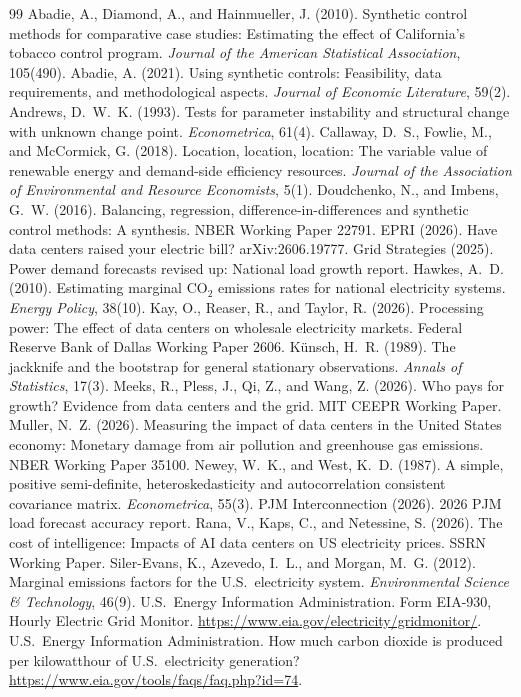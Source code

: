 \documentclass[11pt,a4paper]{article}
\begin{document}
\begin{thebibliography}{99}\small
{} Abadie, A., Diamond, A., and Hainmueller, J. (2010). Synthetic control methods for comparative case studies: Estimating the effect of California's tobacco control program. \emph{Journal of the American Statistical Association}, 105(490).
 Abadie, A. (2021). Using synthetic controls: Feasibility, data requirements, and methodological aspects. \emph{Journal of Economic Literature}, 59(2).
 Andrews, D.~W.~K. (1993). Tests for parameter instability and structural change with unknown change point. \emph{Econometrica}, 61(4).
 Callaway, D.~S., Fowlie, M., and McCormick, G. (2018). Location, location, location: The variable value of renewable energy and demand-side efficiency resources. \emph{Journal of the Association of Environmental and Resource Economists}, 5(1).
 Doudchenko, N., and Imbens, G.~W. (2016). Balancing, regression, difference-in-differences and synthetic control methods: A synthesis. NBER Working Paper 22791.
 EPRI (2026). Have data centers raised your electric bill? arXiv:2606.19777.
 Grid Strategies (2025). Power demand forecasts revised up: National load growth report.
 Hawkes, A.~D. (2010). Estimating marginal CO$_2$ emissions rates for national electricity systems. \emph{Energy Policy}, 38(10).
 Kay, O., Reaser, R., and Taylor, R. (2026). Processing power: The effect of data centers on wholesale electricity markets. Federal Reserve Bank of Dallas Working Paper 2606.
 K\"unsch, H.~R. (1989). The jackknife and the bootstrap for general stationary observations. \emph{Annals of Statistics}, 17(3).
 Meeks, R., Pless, J., Qi, Z., and Wang, Z. (2026). Who pays for growth? Evidence from data centers and the grid. MIT CEEPR Working Paper.
 Muller, N.~Z. (2026). Measuring the impact of data centers in the United States economy: Monetary damage from air pollution and greenhouse gas emissions. NBER Working Paper 35100.
 Newey, W.~K., and West, K.~D. (1987). A simple, positive semi-definite, heteroskedasticity and autocorrelation consistent covariance matrix. \emph{Econometrica}, 55(3).
 PJM Interconnection (2026). 2026 PJM load forecast accuracy report.
 Rana, V., Kaps, C., and Netessine, S. (2026). The cost of intelligence: Impacts of AI data centers on US electricity prices. SSRN Working Paper.
 Siler-Evans, K., Azevedo, I.~L., and Morgan, M.~G. (2012). Marginal emissions factors for the U.S.\ electricity system. \emph{Environmental Science \& Technology}, 46(9).
 U.S.\ Energy Information Administration. Form EIA-930, Hourly Electric Grid Monitor. \url{https://www.eia.gov/electricity/gridmonitor/}.
 U.S.\ Energy Information Administration. How much carbon dioxide is produced per kilowatthour of U.S.\ electricity generation? \url{https://www.eia.gov/tools/faqs/faq.php?id=74}.
\end{thebibliography}
\end{document}
